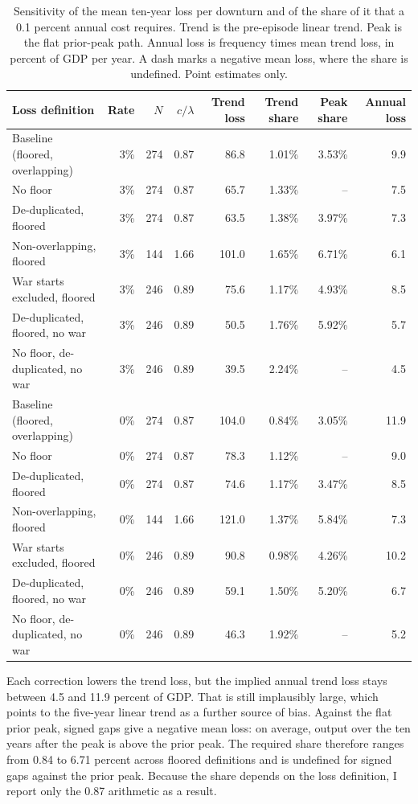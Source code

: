 \documentclass[11pt]{article}
\begin{document}
\begin{table}[htbp]
\centering
\small
\caption{Sensitivity of the mean ten-year loss per downturn and of the share of it that a
0.1 percent annual cost requires. Trend is the pre-episode linear trend. Peak is the flat
prior-peak path. Annual loss is frequency times mean trend loss, in percent of GDP per year.
A dash marks a negative mean loss, where the share is undefined. Point estimates only.}
\label{tab:sensitivity}
\setlength{\tabcolsep}{4pt}
\begin{tabular}{lrrrrrrr}
\toprule
Loss definition & Rate & $N$ & $c/\lambda$ & Trend loss & Trend share & Peak share & Annual loss \\
\midrule
Baseline (floored, overlapping) & 3\% & 274 & 0.87 & 86.8 & 1.01\% & 3.53\% & 9.9 \\
No floor & 3\% & 274 & 0.87 & 65.7 & 1.33\% & -- & 7.5 \\
De-duplicated, floored & 3\% & 274 & 0.87 & 63.5 & 1.38\% & 3.97\% & 7.3 \\
Non-overlapping, floored & 3\% & 144 & 1.66 & 101.0 & 1.65\% & 6.71\% & 6.1 \\
War starts excluded, floored & 3\% & 246 & 0.89 & 75.6 & 1.17\% & 4.93\% & 8.5 \\
De-duplicated, floored, no war & 3\% & 246 & 0.89 & 50.5 & 1.76\% & 5.92\% & 5.7 \\
No floor, de-duplicated, no war & 3\% & 246 & 0.89 & 39.5 & 2.24\% & -- & 4.5 \\
\midrule
Baseline (floored, overlapping) & 0\% & 274 & 0.87 & 104.0 & 0.84\% & 3.05\% & 11.9 \\
No floor & 0\% & 274 & 0.87 & 78.3 & 1.12\% & -- & 9.0 \\
De-duplicated, floored & 0\% & 274 & 0.87 & 74.6 & 1.17\% & 3.47\% & 8.5 \\
Non-overlapping, floored & 0\% & 144 & 1.66 & 121.0 & 1.37\% & 5.84\% & 7.3 \\
War starts excluded, floored & 0\% & 246 & 0.89 & 90.8 & 0.98\% & 4.26\% & 10.2 \\
De-duplicated, floored, no war & 0\% & 246 & 0.89 & 59.1 & 1.50\% & 5.20\% & 6.7 \\
No floor, de-duplicated, no war & 0\% & 246 & 0.89 & 46.3 & 1.92\% & -- & 5.2 \\
\bottomrule
\end{tabular}
\end{table}

Each correction lowers the trend loss, but the implied annual trend loss stays between 4.5
and 11.9 percent of GDP. That is still implausibly large, which points to the five-year
linear trend as a further source of bias. Against the flat prior peak, signed gaps give a
negative mean loss: on average, output over the ten years after the peak is above the prior
peak.
The required share therefore ranges from 0.84 to 6.71 percent across floored definitions
and is undefined for signed gaps against the prior peak. Because the share depends on the
loss definition, I report only the 0.87 arithmetic as a result.
\end{document}
